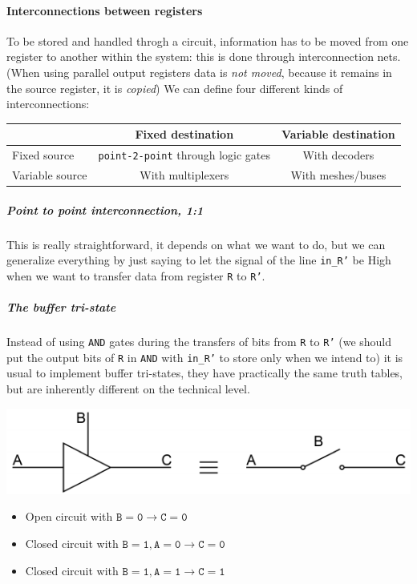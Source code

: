 \documentclass{scrartcl}
\newcommand{\zero}{\texttt{0}}
\newcommand{\one}{\texttt{1}}
\begin{document}
    \paragraph{Interconnections between registers} To be stored and handled throgh a circuit, information has to be moved from one register to another within the system: this is done through interconnection nets. (When using parallel output registers data is \emph{not moved}, because it remains in the source register, it is \emph{copied})
    We can define four different kinds of interconnections:
    \begin{center}
        \begin{tabular}{| l | c | c |}
            \hline
            & Fixed destination & Variable destination \\\hline
            Fixed source & \texttt{point-2-point} through logic gates & With decoders\\
            Variable source & With multiplexers & With meshes/buses\\
            \hline
        \end{tabular}
    \end{center}
    \subparagraph{Point to point interconnection, 1:1} This is really straightforward, it depends on what we want to do, but we can generalize everything by just saying to let the signal of the line \texttt{in\_R'} be High when we want to transfer data from register \texttt{R} to \texttt{R'}.
    \subparagraph{The buffer tri-state} Instead of using \texttt{AND} gates during the transfers of bits from \texttt{R} to \texttt{R'} (we should put the output bits of \texttt{R} in \texttt{AND} with \texttt{in\_R'} to store only when we intend to) it is usual to implement buffer tri-states, they have practically the same truth tables, but are inherently different on the technical level.
    \begin{center}
        \includegraphics{tristate.pdf}
    \end{center}
    \begin{itemize}
        \item Open circuit with $\texttt{B}=\zero\to\texttt{C}=\zero$
        \item Closed circuit with $\texttt{B}=\one, \texttt{A}=\zero\to\texttt{C}=\zero$
        \item Closed circuit with $\texttt{B}=\one, \texttt{A}=\one\to\texttt{C}=\one$
    \end{itemize}
\end{document}
